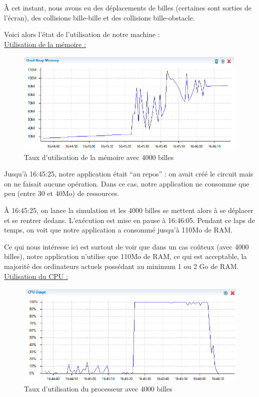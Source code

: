 \documentclass{report}
\begin{document}
À cet instant, nous avons eu des déplacements de billes (certaines sont sorties de l’écran), des collisions bille-bille et des collisions bille-obstacle.

\newpage
Voici alors l’état de l’utilisation de notre machine : \\


\underline{Utilisation de la mémoire :}

\begin{figure}[H]
\centering
\includegraphics[scale=0.9]{timeline_memory.png}
\caption{Taux d'utilisation de la mémoire avec 4000 billes}
\end{figure}

Jusqu’à 16:45:25, notre application était “au repos” : on avait créé le circuit mais on ne faisait aucune opération. Dans ce cas, notre application ne consomme que peu (entre 30 et 40Mo) de ressources. 

À 16:45:25, on lance la simulation et les 4000 billes se mettent alors à se déplacer et se rentrer dedans. L’exécution est mise en pause à 16:46:05.
Pendant ce laps de temps, on voit que notre application a consommé jusqu’à 110Mo de RAM. 
    
Ce qui nous intéresse ici est surtout de voir que dans un cas coûteux (avec 4000 billes), notre application n’utilise que 110Mo de RAM, ce qui est acceptable, la majorité des ordinateurs actuels possédant au minimum 1 ou 2 Go de RAM. \\

\newpage
\underline{Utilisation du CPU :}

\begin{figure}[H]
\centering
\includegraphics[scale=0.9]{timeline_cpu.png}
\caption{Taux d'utilisation du processeur avec 4000 billes}
\end{figure}
\end{document}
